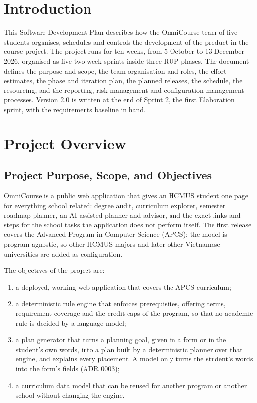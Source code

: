 \documentclass{article}
\newcommand{\chg}[1]{\textcolor{chg}{#1}}
\begin{document}
\clearpage
{}

\section{Introduction}
This Software Development Plan describes how the OmniCourse team of five students organises, schedules and controls the
development of the product in the course project. The project runs for ten weeks, from 5 October to 13 December 2026,
organised as five two-week sprints inside three RUP phases. The document defines the purpose and scope, the team
organisation and roles, \chg{the effort estimates,} the phase and iteration plan, the planned releases, the schedule, the
resourcing, and the reporting, \chg{risk management} and configuration management processes. \chg{Version 2.0 is written at
the end of Sprint 2, the first Elaboration sprint, with the requirements baseline in hand.}

\section{Project Overview}
\subsection{Project Purpose, Scope, and Objectives}
OmniCourse is a public web application that gives an HCMUS student one page for everything school related: degree audit,
curriculum explorer, semester roadmap planner, an AI-assisted planner and advisor, and the exact links and steps for the
school tasks the application does not perform itself. The first release covers the Advanced Program in Computer Science
(APCS); the model is program-agnostic, so other HCMUS majors and later other Vietnamese universities are added as
configuration.

The objectives of the project are:
\begin{enumerate}
  \item a deployed, working web application that covers the APCS curriculum;
  \item a deterministic rule engine that enforces prerequisites, offering terms, requirement coverage and the credit caps
        of the program, so that no academic rule is decided by a language model;
  \item \chg{a plan generator that turns a planning goal, given in a form or in the student's own words, into a plan built by
        a deterministic planner over that engine, and explains every placement. A model only turns the student's words into
        the form's fields (ADR 0003);}
  \item a curriculum data model that can be reused for another program or another school without changing the engine.
\end{enumerate}
\end{document}
